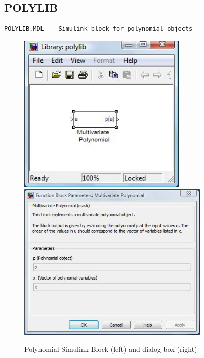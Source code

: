 \documentclass{article}
\begin{document}
\newpage
\subsection{POLYLIB}
\begin{verbatim}
POLYLIB.MDL  - Simulink block for polynomial objects

\end{verbatim}


\begin{figure}[h]
\begin{center}
\includegraphics[height=3.0in]{figs/polylib.jpg}
\includegraphics[height=3.0in]{figs/polylibdialog.jpg}
\caption{Polynomial Simulink Block (left) and dialog box (right)}
\end{center}
\end{figure}


\newpage
\end{document}
